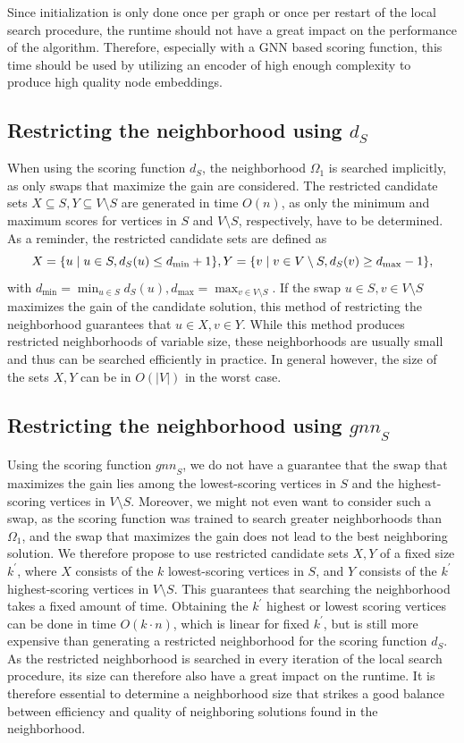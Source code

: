 \documentclass[draft,final]{vutinfth} %
\begin{document}
Since initialization is only done once per graph or once per restart of the local search procedure, the runtime should not have a great impact on the performance of the algorithm. Therefore, especially with a GNN based scoring function, this time should be used by utilizing an encoder of high enough complexity to produce high quality node embeddings. 

\subsection{Restricting the neighborhood using $d_S$}
When using the scoring function $d_S$, the neighborhood $\Omega_1$ is searched implicitly, as only swaps that maximize the gain are considered. 
The restricted candidate sets $X \subseteq S, Y \subseteq V \setminus S$ are generated in time $O(n)$, as only the minimum and maximum scores for vertices in $S$ and $V \setminus S$, respectively, have to be determined. As a reminder, the restricted candidate sets are defined as 
\[
    X = \{ u \mid u \in S, d_S(u) \leq d_{\min} + 1 \}, \\
    Y = \{ v \mid v \in V \setminus S, d_S(v) \geq d_{\max} - 1 \},
\]
with $d_{\min} = \min_{u \in S} d_S(u), d_{\max} = \max_{v \in V \setminus S}$. 
If the swap $u \in S,v \in V \setminus S$ maximizes the gain of the candidate solution, this method of restricting the neighborhood guarantees that $u \in X, v \in Y$.
While this method produces restricted neighborhoods of variable size, these neighborhoods are usually small and thus can be searched efficiently in practice. In general however, the size of the sets $X, Y$ can be in $O(|V|)$ in the worst case. 

\subsection{Restricting the neighborhood using $\mathit{gnn}_S$}

Using the scoring function $\mathit{gnn}_S$, we do not have a guarantee that the swap that maximizes the gain lies among the lowest-scoring vertices in $S$ and the highest-scoring vertices in $V \setminus S$. Moreover, we might not even want to consider such a swap, as the scoring function was trained to search greater neighborhoods than $\Omega_1$, and the swap that maximizes the gain does not lead to the best neighboring solution. We therefore propose to use restricted candidate sets $X,Y$ of a fixed size $k^\prime$, where $X$ consists of the $k$ lowest-scoring vertices in $S$, and $Y$ consists of the $k^\prime$ highest-scoring vertices in $V \setminus S$. This guarantees that searching the neighborhood takes a fixed amount of time. 
Obtaining the $k^\prime$ highest or lowest scoring vertices can be done in time $O(k \cdot n)$, which is linear for fixed $k^\prime$, but is still more expensive than generating a restricted neighborhood for the scoring function $d_S$. As the restricted neighborhood is searched in every iteration of the local search procedure, its size can therefore also have a great impact on the runtime. It is therefore essential to determine a neighborhood size that strikes a good balance between efficiency and quality of neighboring solutions found in the neighborhood.  
\end{document}
